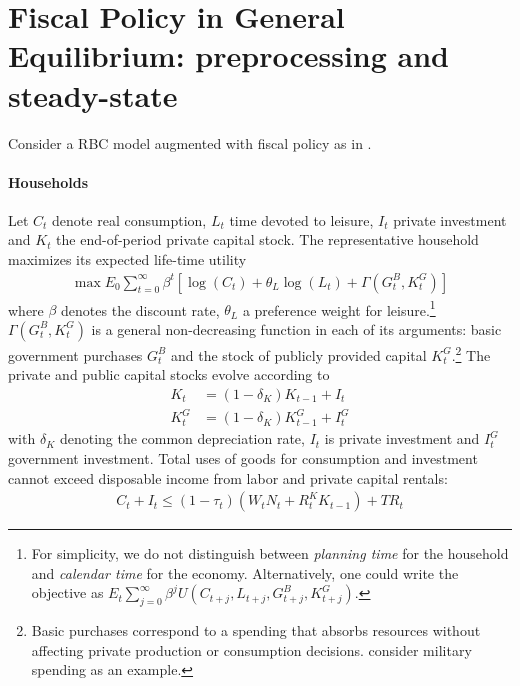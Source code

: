 \section[Fiscal Policy in General Equilibrium: preprocessing and steady-state]{Fiscal Policy in General Equilibrium: preprocessing and steady-state\label{ex:BaxterKingPreprocessSteady}}
Consider a RBC model augmented with fiscal policy as in \textcite{Baxter.King_1993_FiscalPolicyGeneral}.

\paragraph*{Households}
Let \(C_t\) denote real consumption, \(L_t\) time devoted to leisure,
  \(I_t\) private investment and \(K_t\) the end-of-period private capital stock.
The representative household maximizes its expected life-time utility
\begin{align*}
\max E_0 \sum_{t=0}^\infty \beta^t \left[\log{(C_t)}+\theta_L \log{(L_t)} + \Gamma(G_t^B,K_t^G)\right]
\end{align*}
where \(\beta \) denotes the discount rate, \(\theta_L\) a preference weight for leisure.\footnote{%
For simplicity, we do not distinguish between \emph{planning time} for the household and \emph{calendar time} for the economy.
Alternatively, one could write the objective as \(E_t \sum_{j=0}^\infty \beta^j U(C_{t+j},L_{t+j},G_{t+j}^B,K_{t+j}^G)\).
}
\(\Gamma(G_t^B,K_t^G)\) is a general non-decreasing function in each of its arguments:
  basic government purchases \(G_t^B\) and the stock of publicly provided capital \(K_t^G\).\footnote{%
Basic purchases correspond to a spending that absorbs resources without affecting private production or consumption decisions.
\textcite{Baxter.King_1993_FiscalPolicyGeneral} consider military spending as an example.
}
The private and public capital stocks evolve according to
\begin{align}
K_{t} &= (1-\delta_K)K_{t-1} + I_t \label{eq:BaxterKing:PrivateCapital}\\
K_{t}^G &= (1-\delta_K)K_{t-1}^G + I_t^G \label{eq:BaxterKing:PublicCapital}
\end{align}
  with \(\delta_K\) denoting the common depreciation rate,
  \(I_t\) is private investment and \(I_t^G\) government investment.
Total uses of goods for consumption and investment cannot exceed disposable income from labor and private capital rentals:
\begin{align*}
C_t + I_t \leq (1-\tau_t)(W_t N_t + R^K_{t} K_{t-1}) + {TR}_t
\end{align*}
